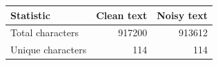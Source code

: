 \begin{tabular}{lrr}
\toprule
Statistic & Clean text & Noisy text \\
\midrule
Total characters & 917200 & 913612 \\
Unique characters & 114 & 114 \\
\bottomrule
\end{tabular}
